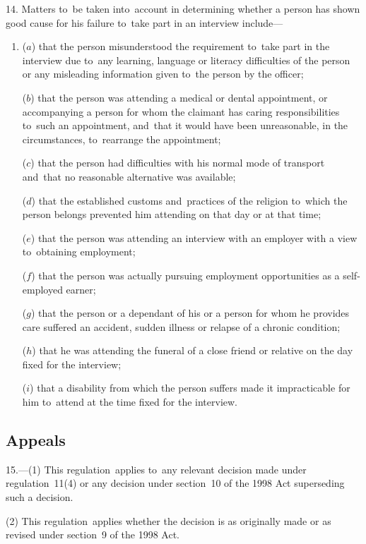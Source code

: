 \documentclass[12pt,a4paper]{article}
\begin{document}
14.  Matters to~be taken into~account in determining whether a person has shown good cause for his failure to~take part in an interview include—
\begin{enumerate}\item[]
($a$) that the person misunderstood the requirement to~take part in the interview due to~any learning, language or literacy difficulties of the person or any misleading information given to~the person by the officer;

($b$) that the person was attending a medical or dental appointment, or accompanying a person for whom the claimant has caring responsibilities to~such an appointment, and~that it would have been unreasonable, in the circumstances, to~rearrange the appointment;

($c$) that the person had difficulties with his normal mode of transport and~that no reasonable alternative was available;

($d$) that the established customs and~practices of the religion to~which the person belongs prevented him attending on that day or at that time;

($e$) that the person was attending an interview with an employer with a view to~obtaining employment;

($f$) that the person was actually pursuing employment opportunities as a self-employed earner;

($g$) that the person or a dependant of his or a person for whom he provides care suffered an accident, sudden illness or relapse of a chronic condition;%

($h$) that he was attending the funeral of a close friend or relative on the day fixed for the interview;

($i$) that a disability from which the person suffers made it impracticable for him to~attend at the time fixed for the interview.
\end{enumerate}

\subsection[15. Appeals]{Appeals}

15.---(1)  This regulation~applies to~any relevant decision made under regulation~11(4) or any decision under section~10 of the 1998 Act superseding such a decision.%

(2) This regulation~applies whether the decision is as originally made or as revised under section~9 of the 1998 Act.
\end{document}
